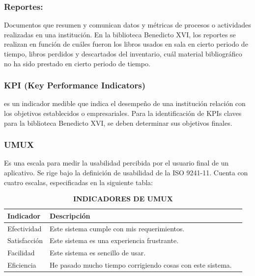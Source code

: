 \documentclass[spanish]{ieee_upb}
\begin{document}
  \subsubsection{Reportes: }Documentos que resumen y comunican datos y métricas de procesos o actividades realizadas en una institución\cite{ibm_reports_2018}. En la biblioteca Benedicto XVI, los reportes se realizan en función de cuáles fueron los libros usados en sala en cierto periodo de tiempo, libros perdidos y descartados del inventario, cuál material bibliográfico no ha sido prestado en cierto periodo de tiempo.

    \subsubsection{KPI (Key Performance Indicators)} es un indicador medible que indica el desempeño de una institución relación con los objetivos establecidos o empresariales\cite{marr2012key}. Para la identificación de KPIs claves para la biblioteca Benedicto XVI, se deben determinar sus objetivos finales. 
    
  \subsubsection{UMUX} Es una escala para medir la usabilidad percibida por el usuario final de un aplicativo. Se rige bajo la definición de usabilidad de la ISO 9241-11\cite{finstad2010usabilityUMUX}. Cuenta con cuatro escalas, especificadas en la siguiente tabla: 

\begin{table}[htpb]
    \centering
    \caption[Indicadores de UMUX]{\bfseries INDICADORES DE UMUX\cite{finstad2010usabilityUMUX}}
    \label{tab:evaluacion_sistema}
    \begin{tabular}{lll} \hline
        \textbf{Indicador} & \textbf{Descripción} \\ \hline
        Efectividad  & Este sistema cumple con mis requerimientos. \\
        Satisfacción & Este sistema es una experiencia frustrante. \\ 
        Facilidad    & Este sistema es sencillo de usar. \\ 
        Eficiencia   & He pasado mucho tiempo corrigiendo cosas con este sistema. \\ \hline
    \end{tabular}
    \vspace{-2mm}
    \newline
\end{table}
\end{document}
